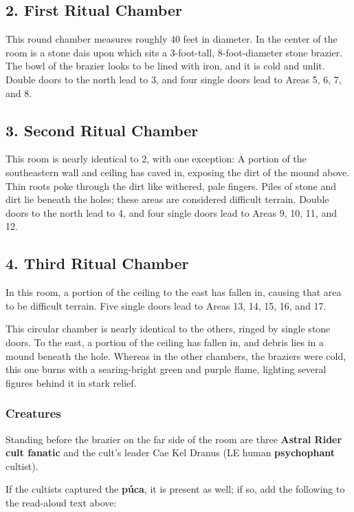 \documentclass[10pt,a4paper,twoside,bg=print,twocolumn,openany,nodeprecatedcode]{dndbook}
\begin{document}
\subsection{2. First Ritual Chamber}
This round chamber measures roughly 40 feet in diameter. In the center of the room is a stone dais upon which sits a 3-foot-tall, 8-foot-diameter stone brazier. The bowl of the brazier looks to be lined with iron, and it is cold and unlit. Double doors to the north lead to 3, and four single doors lead to Areas 5, 6, 7, and 8.

\subsection{3. Second Ritual Chamber}
This room is nearly identical to 2, with one exception: A portion of the southeastern wall and ceiling has caved in, exposing the dirt of the mound above. Thin roots poke through the dirt like withered, pale fingers. Piles of stone and dirt lie beneath the holes; these areas are considered difficult terrain. Double doors to the north lead to  4, and four single doors lead to Areas 9, 10, 11, and 12.

\subsection{4. Third Ritual Chamber}
In this room, a portion of the ceiling to the east has fallen in, causing that area to be difficult terrain. Five single doors lead to Areas 13, 14, 15, 16, and 17.

\begin{DndReadAloud}{}
This circular chamber is nearly identical to the others, ringed by single stone doors. To the east, a portion of the ceiling has fallen in, and debris lies in a mound beneath the hole. Whereas in the other chambers, the braziers were cold, this one burns with a searing-bright green and purple flame, lighting several figures behind it in stark relief.

\end{DndReadAloud}

\subsubsection{Creatures}
Standing before the brazier on the far side of the room are three \textbf{Astral Rider cult fanatic} and the cult's leader Cae Kel Dranus (LE human \textbf{psychophant} cultist).

If the cultists captured the \textbf{púca}, it is present as well; if so, add the following to the read-aloud text above:
\end{document}
